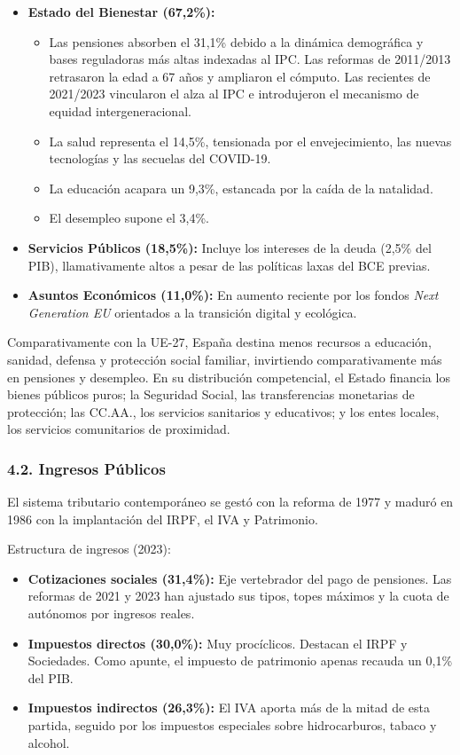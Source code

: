 \begin{itemize}
  \item \textbf{Estado del Bienestar (67,2\%):}
    \begin{itemize}
      \item Las pensiones absorben el 31,1\% debido a la dinámica demográfica y bases reguladoras más altas indexadas al IPC. Las reformas de 2011/2013 retrasaron la edad a 67 años y ampliaron el cómputo. Las recientes de 2021/2023 vincularon el alza al IPC e introdujeron el mecanismo de equidad intergeneracional.
      \item La salud representa el 14,5\%, tensionada por el envejecimiento, las nuevas tecnologías y las secuelas del COVID-19.
      \item La educación acapara un 9,3\%, estancada por la caída de la natalidad.
      \item El desempleo supone el 3,4\%.
    \end{itemize}
  \item \textbf{Servicios Públicos (18,5\%):} Incluye los intereses de la deuda (2,5\% del PIB), llamativamente altos a pesar de las políticas laxas del BCE previas.
  \item \textbf{Asuntos Económicos (11,0\%):} En aumento reciente por los fondos \textit{Next Generation EU} orientados a la transición digital y ecológica.
\end{itemize}

Comparativamente con la UE-27, España destina menos recursos a educación, sanidad, defensa y protección social familiar, invirtiendo comparativamente más en pensiones y desempleo. En su distribución competencial, el Estado financia los bienes públicos puros; la Seguridad Social, las transferencias monetarias de protección; las CC.AA., los servicios sanitarios y educativos; y los entes locales, los servicios comunitarios de proximidad.

\subsubsection*{4.2. Ingresos Públicos}

El sistema tributario contemporáneo se gestó con la reforma de 1977 y maduró en 1986 con la implantación del IRPF, el IVA y Patrimonio.

Estructura de ingresos (2023):

\begin{itemize}
  \item \textbf{Cotizaciones sociales (31,4\%):} Eje vertebrador del pago de pensiones. Las reformas de 2021 y 2023 han ajustado sus tipos, topes máximos y la cuota de autónomos por ingresos reales.
  \item \textbf{Impuestos directos (30,0\%):} Muy procíclicos. Destacan el IRPF y Sociedades. Como apunte, el impuesto de patrimonio apenas recauda un 0,1\% del PIB.
  \item \textbf{Impuestos indirectos (26,3\%):} El IVA aporta más de la mitad de esta partida, seguido por los impuestos especiales sobre hidrocarburos, tabaco y alcohol.
\end{itemize}

